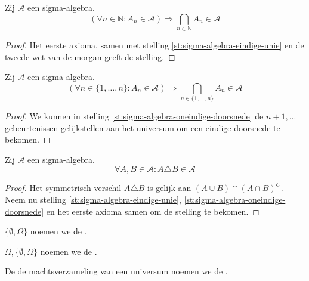 \documentclass[main.tex]{subfiles}
\begin{document}
\begin{st}
  \label{st:sigma-algebra-oneindige-doorsnede}
  Zij $\mathcal{A}$ een sigma-algebra.
  \[ (\forall n\in \mathbb{N}: A_{n} \in \mathcal{A}) \Rightarrow \bigcap_{n\in \mathbb{N}}A_{n} \in \mathcal{A} \]

  \begin{proof}
    Het eerste axioma, samen met stelling \ref{st:sigma-algebra-eindige-unie} en de tweede wet van de morgan geeft de stelling.
  \end{proof}
\end{st}

\begin{st}
  Zij $\mathcal{A}$ een sigma-algebra.
  \[ (\forall n\in \{ 1,\dotsc,n \}: A_{n} \in \mathcal{A}) \Rightarrow \bigcap_{n\in \{1,\dotsc,n\}}A_{n} \in \mathcal{A} \]

  \begin{proof}
    We kunnen in stelling \ref{st:sigma-algebra-oneindige-doorsnede} de $n+1,...$ gebeurtenissen gelijkstellen aan het universum om een eindige doorsnede te bekomen.
  \end{proof}
\end{st}

\begin{st}
  Zij $\mathcal{A}$ een sigma-algebra.
  \[ \forall A,B \in \mathcal{A}: A \triangle B \in \mathcal{A} \]

  \begin{proof}
    Het symmetrisch verschil $A \triangle B$ is gelijk aan $(A\cup B) \cap (A \cap B)^{C}$. 
    Neem nu stelling \ref{st:sigma-algebra-eindige-unie}, \ref{st:sigma-algebra-oneindige-doorsnede} en het eerste axioma samen om de stelling te bekomen.
  \end{proof}
\end{st}

\begin{de}
  $\{ \emptyset, \Omega \}$ noemen we de .
\end{de}
\begin{de}
  $\Omega,\{ \emptyset, \Omega \}$ noemen we de .
\end{de}

\begin{de}
  De de machtsverzameling van een universum noemen we de .
\end{de}
\end{document}
